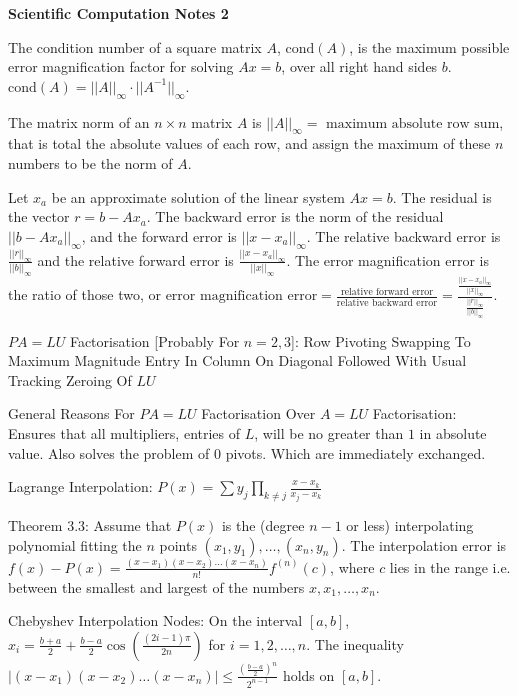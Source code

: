 \Large
\twocolumn

\textbf{Scientific Computation Notes 2}

The condition number of a square matrix $A$, $\text{cond}(A)$, is the maximum possible error magnification factor for solving $Ax = b$, over all right hand sides $b$. $\text{cond}(A) = ||A||_{\infty} \cdot || A^{-1} ||_{\infty}$.

The matrix norm of an $n \times n$ matrix $A$ is $||A||_{\infty} = \text{ maximum absolute row sum}$, that is total the absolute values of each row, and assign the maximum of these $n$ numbers to be the norm of $A$.

Let $x_a$ be an approximate solution of the linear system $Ax = b$. The residual is the vector $r = b-Ax_a$. The backward error is the norm of the residual $|| b-Ax_a ||_{\infty}$, and the forward error is $|| x-x_a ||_{\infty}$. The relative backward error is $\frac{||r||_{\infty}}{||b||_{\infty}}$ and the relative forward error is $\frac{||x-x_a||_{\infty}}{||x||_{\infty}}$. The error magnification error is the ratio of those two, or $\text{error magnification error} = \frac{\text{relative forward error}}{\text{relative backward error}} = \frac{\frac{||x-x_a||_{\infty}}{||x||_{\infty}}}{\frac{||r||_{\infty}}{||b||_{\infty}}}$.

$PA=LU$ Factorisation [Probably For $n=2,3$]: Row Pivoting Swapping To Maximum Magnitude Entry In Column On Diagonal Followed With Usual Tracking Zeroing Of $LU$

General Reasons For $PA=LU$ Factorisation Over $A=LU$ Factorisation: \\
Ensures that all multipliers, entries of $L$, will be no greater than $1$ in absolute value. Also solves the problem of $0$ pivots. Which are immediately exchanged.

Lagrange Interpolation: $P(x) = \sum y_j \prod_{k \neq j} \frac{x-x_k}{x_j-x_k}$

Theorem 3.3: Assume that $P(x)$ is the (degree $n-1$ or less) interpolating polynomial fitting the $n$ points $(x_1,y_1),\dots,(x_n,y_n)$. The interpolation error is $f(x)-P(x) = \frac{(x-x_1)(x-x_2)\dots (x-x_n)}{n!} f^{(n)}(c)$, where $c$ lies in the range i.e. between the smallest and largest of the numbers $x,x_1,\dots,x_n$.

Chebyshev Interpolation Nodes: On the interval $[a,b]$, $x_i = \frac{b+a}{2} + \frac{b-a}{2} \cos \left( \frac{(2 i-1)\pi}{2n} \right)$ for $i=1,2,\dots ,n$. The inequality $|(x-x_1)(x-x_2) \dots (x-x_n)| \le \frac{ \left( \frac{b-a}{2} \right)^n }{2^{n-1}}$ holds on $[a,b]$.

